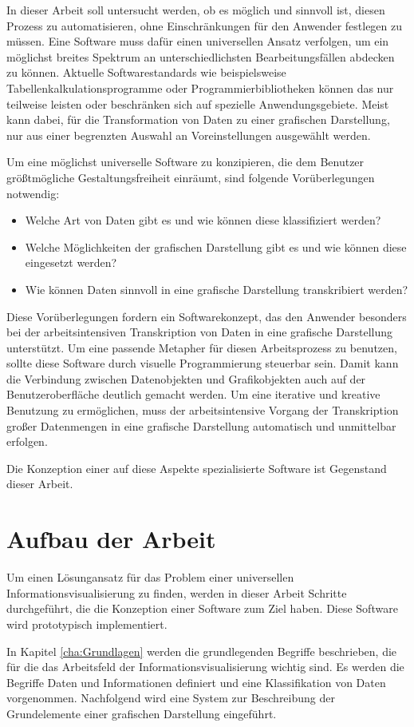 \documentclass[a4paper, 12pt, DIV=calc, version=first, pdftex, headsepline, footsepline, bibtotocnumbered, liststotocnumbered]{scrreprt}
\begin{document}
In dieser Arbeit soll untersucht werden, ob es möglich und sinnvoll ist, diesen Prozess  zu automatisieren,
ohne Einschränkungen für den Anwender festlegen zu müssen.
Eine Software muss dafür einen universellen Ansatz verfolgen, um ein möglichst breites Spektrum an
unterschiedlichsten Bearbeitungsfällen abdecken zu können. 
Aktuelle Softwarestandards wie beispielsweise Tabellenkalkulationsprogramme oder Programmierbibliotheken
können das nur teilweise leisten oder beschränken sich auf spezielle Anwendungsgebiete.
Meist kann dabei, für die Transformation von Daten zu einer grafischen Darstellung, nur
aus einer begrenzten Auswahl an Voreinstellungen ausgewählt werden.

Um eine möglichst universelle Software zu konzipieren, die dem Benutzer größtmögliche
Gestaltungsfreiheit einräumt, sind folgende Vorüberlegungen notwendig:
\begin{itemize}
\item{Welche Art von Daten gibt es und wie können diese klassifiziert werden?}
\item{Welche Möglichkeiten der grafischen Darstellung gibt es und wie können diese eingesetzt werden?}
\item{Wie können Daten sinnvoll in eine grafische Darstellung transkribiert werden?}
\end{itemize}
Diese Vorüberlegungen fordern ein Softwarekonzept, das den Anwender besonders bei der 
arbeitsintensiven Transkription
von Daten in eine grafische Darstellung unterstützt. Um eine passende Metapher für diesen Arbeitsprozess zu benutzen,
sollte diese Software durch visuelle Programmierung steuerbar sein. Damit kann die Verbindung zwischen Datenobjekten
und Grafikobjekten auch auf der Benutzeroberfläche deutlich gemacht werden.
Um eine iterative und kreative Benutzung zu ermöglichen, muss der arbeitsintensive Vorgang
der Transkription großer Datenmengen in eine grafische Darstellung
automatisch und unmittelbar erfolgen.

Die Konzeption einer auf diese Aspekte spezialisierte Software ist Gegenstand dieser Arbeit.
\section{Aufbau der Arbeit}
Um einen Lösungansatz für das Problem einer universellen Informationsvisualisierung
zu finden, werden in dieser Arbeit Schritte durchgeführt, die die Konzeption einer Software zum Ziel haben.
Diese Software wird prototypisch implementiert.

In Kapitel \ref{cha:Grundlagen} werden die grundlegenden Begriffe beschrieben, die für die 
das Arbeitsfeld der Informationsvisualisierung wichtig sind. Es werden die Begriffe
Daten und Informationen definiert und eine Klassifikation von Daten vorgenommen.
Nachfolgend wird eine System zur Beschreibung der Grundelemente einer grafischen Darstellung
eingeführt. 
\end{document}
